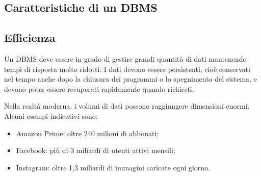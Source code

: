 \documentclass[a4paper,12pt]{article}
\begin{document}
\begin{center}
\end{center}

\subsection{Caratteristiche di un DBMS}
\subsection*{Efficienza}
Un DBMS deve essere in grado di gestire grandi quantità di dati mantenendo tempi di risposta molto ridotti.  
I dati devono essere persistenti, cioè conservati nel tempo anche dopo la chiusura dei programmi o lo spegnimento del sistema, e devono poter essere recuperati rapidamente quando richiesti.

Nella realtà moderna, i volumi di dati possono raggiungere dimensioni enormi. Alcuni esempi indicativi sono:
\begin{itemize}
    \item Amazon Prime: oltre 240 milioni di abbonati;
    \item Facebook: più di 3 miliardi di utenti attivi mensili;
    \item Instagram: oltre 1,3 miliardi di immagini caricate ogni giorno.
\end{itemize}
\end{document}
